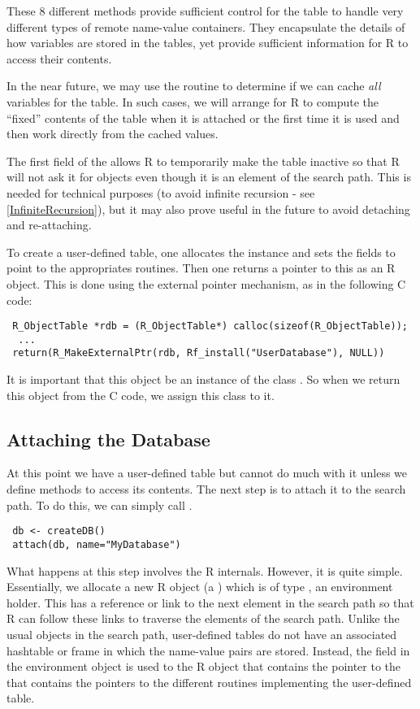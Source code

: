 \documentclass{article}
\begin{document}
These $8$ different methods provide sufficient control for the table
to handle very different types of remote name-value containers.  They
encapsulate the details of how variables are stored in the tables, yet
provide sufficient information for R to access their contents.

In the near future, we may use the  routine to
determine if we can cache \textit{all} variables for the table.  In
such cases, we will arrange for R to compute the ``fixed'' contents of
the table when it is attached or the first time it is used and then
work directly from the cached values.

The first field of the  allows R to temporarily
make the table inactive so that R will not ask it for objects even
though it is an element of the search path.  This is needed for
technical purposes (to avoid infinite recursion - see \ref{InfiniteRecursion}), but it may also
prove useful in the future to avoid detaching and re-attaching.


To create a user-defined table, one allocates the
 instance and sets the fields to point to the
appropriates routines.  Then one returns a pointer to this
 as an  R object.
This is done using the external pointer mechanism,
as in the following C code:
\begin{verbatim}
 R_ObjectTable *rdb = (R_ObjectTable*) calloc(sizeof(R_ObjectTable));
  ...
 return(R_MakeExternalPtr(rdb, Rf_install("UserDatabase"), NULL))
\end{verbatim}
It is important that this object be an instance of the class
.
So when we return this object from the C code, we
assign this class to it.


\subsection{Attaching the Database}
At this point we have a user-defined table but cannot do much with it
unless we define methods to access its contents.  The next step is to
attach it to the search path. To do this, we can simply call
.
\begin{verbatim}
 db <- createDB()
 attach(db, name="MyDatabase")
\end{verbatim}

What happens at this step involves the R internals.  However, it is
quite simple. Essentially, we allocate a new R object (a
) which is of type , an environment
holder.  This has a reference or link to the next element in the
search path so that R can follow these links to traverse the elements
of the search path.  Unlike the usual objects in the search path,
user-defined tables do not have an associated hashtable or frame in
which the name-value pairs are stored.  Instead, the 
field in the environment object is used to the R object that contains
the pointer to the  that contains the pointers
to the different routines implementing the user-defined table.
\end{document}
